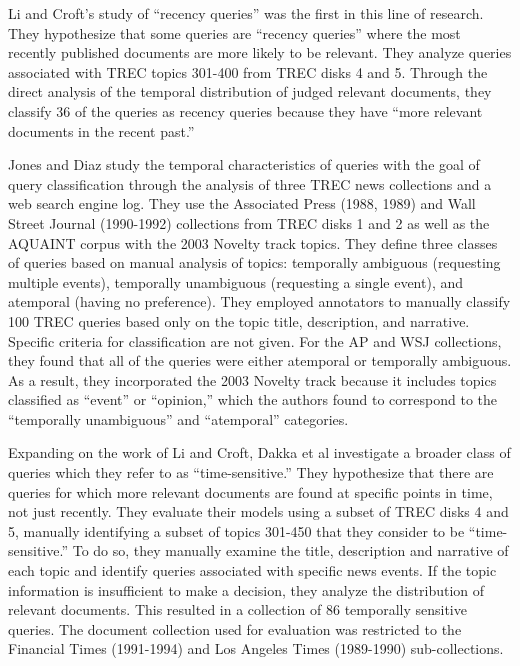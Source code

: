 \documentclass[runningheads,a4paper]{llncs}
\begin{document}
Li and Croft's study of ``recency queries''  \cite{Li2003} was the first in this line of research. They hypothesize that some queries are ``recency queries'' where the most recently published documents are more likely to be relevant. They analyze queries associated with TREC topics 301-400 from TREC disks 4 and 5. Through the direct analysis of the temporal distribution of judged relevant documents, they classify 36 of the queries as recency queries because they have ``more relevant documents in the recent past.''

Jones and Diaz \cite{Jones2007} study the temporal characteristics of queries with the goal of query classification through the analysis of three TREC news collections and a web search engine log. They use the Associated Press (1988, 1989) and Wall Street Journal (1990-1992) collections from TREC disks 1 and 2 as well as the AQUAINT corpus with the 2003 Novelty track topics. They define three classes of queries based on manual analysis of topics: temporally ambiguous (requesting multiple events),  temporally unambiguous (requesting a single event), and atemporal (having no preference). They employed annotators to  manually classify 100 TREC queries based only on the topic title, description, and narrative. Specific criteria for classification are not given. For the AP and WSJ collections, they found that all of the queries were either atemporal or temporally ambiguous. As a result, they incorporated the 2003 Novelty track because it includes topics classified as ``event'' or ``opinion,'' which the authors found to correspond to the ``temporally unambiguous'' and ``atemporal'' categories. 

Expanding on the work of Li and Croft, Dakka et al \cite{Dakka2012} investigate a broader class of queries which they refer to as ``time-sensitive.'' They hypothesize that there are queries for which more relevant documents are found at specific points in time, not just recently. They evaluate their models using a subset of TREC disks 4 and 5, manually identifying a subset of topics 301-450 that they consider to be ``time-sensitive.'' To do so, they manually examine the title, description and narrative of each topic and identify queries associated with specific news events. If the topic information is insufficient to make a decision, they analyze the distribution of relevant documents. This resulted in a collection of 86 temporally sensitive queries. The document collection used for evaluation was restricted to the Financial Times (1991-1994) and Los Angeles Times (1989-1990) sub-collections.
\end{document}
